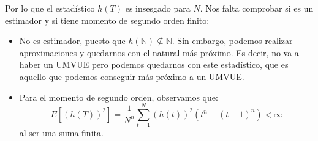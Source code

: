 \begin{ejercicio}
    Por lo que el estadístico $h(T)$ es insesgado para $N$. Nos falta comprobar si es un estimador y si tiene momento de segundo orden finito:
    \begin{itemize}
        \item No es estimador, puesto que $h(\mathbb{N})\nsubseteq \mathbb{N}$. Sin embargo, podemos realizar aproximaciones y quedarnos con el natural más próximo. Es decir, no va a haber un UMVUE pero podemos quedarnos con este estadístico, que es aquello que podemos conseguir más próximo a un UMVUE. %
        \item Para el momento de segundo orden, observamos que:
            \begin{equation*}
                E[{(h(T))}^{2}] = \dfrac{1}{N^n}\sum_{t=1}^{N}{(h(t))}^{2}(t^n-{(t-1)}^{n}) < \infty
            \end{equation*}
            al ser una suma finita.
    \end{itemize}
\end{ejercicio}

